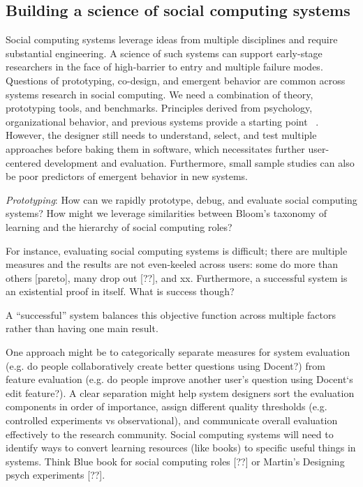 \subsection{Building a science of social computing systems}
Social computing systems leverage ideas from multiple disciplines and require substantial engineering. A science of such systems can support early-stage researchers in the face of high-barrier to entry and multiple failure modes. Questions of prototyping, co-design, and emergent behavior are common across systems research in social computing. We need a combination of theory, prototyping tools, and benchmarks. Principles derived from psychology, organizational behavior, and previous systems provide a starting point ~\cite{fromstatement}. However, the designer still needs to understand, select, and test multiple approaches before baking them in software, which necessitates further user-centered development and evaluation. Furthermore, small sample studies can also be poor predictors of emergent behavior in new systems. 

\textit{Prototyping}: How can we rapidly prototype, debug, and evaluate social computing systems? How might we leverage similarities between Bloom’s taxonomy of learning and the hierarchy of social computing roles?

For instance, evaluating social computing systems is difficult; there are multiple measures and the results are not even-keeled across users: some do more than others [pareto], many drop out [??], and xx. Furthermore, a successful system is an existential proof in itself. What is success though?

A “successful” system balances this objective function across multiple factors rather than having one main result. 

One approach might be to categorically separate measures for system evaluation (e.g. do people collaboratively create better questions using Docent?) from feature evaluation (e.g. do people improve another user’s question using Docent‘s edit feature?). A clear separation might help system designers sort the evaluation components in order of importance, assign different quality thresholds (e.g. controlled experiments vs observational), and communicate overall evaluation effectively to the research community.
Social computing systems will need to identify ways to convert learning resources (like books) to specific useful things in systems. Think Blue book for social computing roles [??] or Martin’s Designing psych experiments [??]. 

